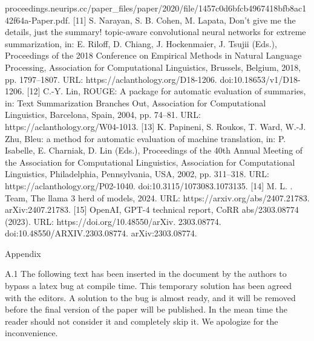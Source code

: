 {proceedings.neurips.cc/paper\_files/paper/2020/file/1457c0d6bfcb4967418bfb8ac142f64a-Paper.pdf.
[11] S. Narayan, S. B. Cohen, M. Lapata, Don’t give me the details, just the summary! topic-aware
convolutional neural networks for extreme summarization, in: E. Riloff, D. Chiang, J. Hockenmaier,
J. Tsujii (Eds.), Proceedings of the 2018 Conference on Empirical Methods in Natural Language
Processing, Association for Computational Linguistics, Brussels, Belgium, 2018, pp. 1797–1807.
URL: https://aclanthology.org/D18-1206. doi:10.18653/v1/D18- 1206.
[12] C.-Y. Lin, ROUGE: A package for automatic evaluation of summaries, in: Text Summarization
Branches Out, Association for Computational Linguistics, Barcelona, Spain, 2004, pp. 74–81. URL:
https://aclanthology.org/W04-1013.
[13] K. Papineni, S. Roukos, T. Ward, W.-J. Zhu, Bleu: a method for automatic evaluation of machine
translation, in: P. Isabelle, E. Charniak, D. Lin (Eds.), Proceedings of the 40th Annual Meeting
of the Association for Computational Linguistics, Association for Computational Linguistics,
Philadelphia, Pennsylvania, USA, 2002, pp. 311–318. URL: https://aclanthology.org/P02-1040.
doi:10.3115/1073083.1073135.
[14] M. L. . Team, The llama 3 herd of models, 2024. URL: https://arxiv.org/abs/2407.21783.
arXiv:2407.21783.
[15] OpenAI, GPT-4 technical report, CoRR abs/2303.08774 (2023). URL: https://doi.org/10.48550/arXiv.
2303.08774. doi:10.48550/ARXIV.2303.08774. arXiv:2303.08774.

Appendix

A.1 The following text has been inserted in the document by the authors to bypass a latex bug at compile time. This temporary solution has been agreed with the editors. A solution to the bug is almost ready, and it will be removed before the final version of the paper will be published. In the mean time the reader should not consider it and completely skip it. We apologize for the inconvenience.
}
